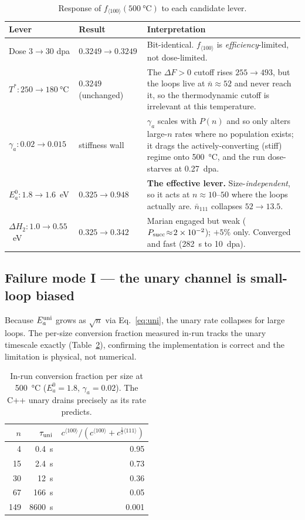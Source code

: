 \documentclass[11pt,a4paper]{article}
\newcommand{\fhkl}{f_{\langle100\rangle}}
\newcommand{\bv}{\tfrac12\langle111\rangle}
\begin{document}
\begin{table}[h]
\centering
\caption{Response of $\fhkl(\SI{500}{\celsius})$ to each candidate lever.}
\label{tab:levers}
\begin{tabular}{llp{7.4cm}}
\toprule
Lever & Result & Interpretation \\
\midrule
Dose $3\to30$ dpa & $0.3249\to0.3249$ & Bit-identical. $\fhkl$ is
\emph{efficiency}-limited, not dose-limited. \\
$T^\ast:250\to\SI{180}{\celsius}$ & $0.3249$ (unchanged) & The $\Delta F>0$ cutoff
rises $255\to493$, but the loops live at $\bar n\approx52$ and never reach it, so
the thermodynamic cutoff is irrelevant at this temperature. \\
$\gamma_a:0.02\to0.015$ & stiffness wall & $\gamma_a$ scales with $P(n)$ and so
only alters large-$n$ rates where no population exists; it drags the
actively-converting (stiff) regime onto \SI{500}{\celsius}, and the run
dose-starves at 0.27~dpa. \\
$E_a^0:1.8\to1.6$~eV & $0.325\to0.948$ & \textbf{The effective lever.}
Size-\emph{independent}, so it acts at $n\approx10$--$50$ where the loops
actually are. $\bar n_{111}$ collapses $52\to13.5$. \\
$\Delta H_2:1.0\to0.55$~eV & $0.325\to0.342$ & Marian engaged but weak
($P_{\rm succ}\!\approx\!2\times10^{-2}$); $+5\%$ only. Converged and fast
(282~s to 10~dpa). \\
\bottomrule
\end{tabular}
\end{table}

\subsection{Failure mode I --- the unary channel is small-loop biased}

Because $E_a^{\rm uni}$ grows as $\sqrt{n}$ via Eq.~\eqref{eq:uni}, the unary
rate collapses for large loops. The per-size conversion fraction measured
in-run tracks the unary timescale exactly (Table~\ref{tab:drain}), confirming the
implementation is correct and the limitation is physical, not numerical.

\begin{table}[h]
\centering
\caption{In-run conversion fraction per size at \SI{500}{\celsius}
($E_a^0=1.8$, $\gamma_a=0.02$). The C++ unary drains precisely as its rate
predicts.}
\label{tab:drain}
\begin{tabular}{rrr}
\toprule
$n$ & $\tau_{\rm uni}$ & $c^{\langle100\rangle}/(c^{\langle100\rangle}+c^{\bv})$ \\
\midrule
4   & \SI{0.4}{s}    & 0.95 \\
15  & \SI{2.4}{s}    & 0.73 \\
30  & \SI{12}{s}     & 0.36 \\
67  & \SI{166}{s}    & 0.05 \\
149 & \SI{8600}{s}   & 0.001 \\
\bottomrule
\end{tabular}
\end{table}
\end{document}
